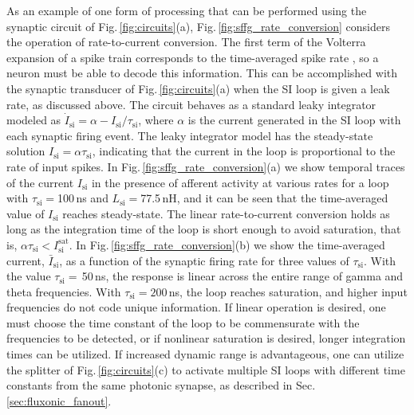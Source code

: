 \documentclass[twocolumn]{article}
\begin{document}
As an example of one form of processing that can be performed using the synaptic circuit of Fig.\,\ref{fig:circuits}(a), Fig.\,\ref{fig:sffg_rate_conversion} considers the operation of rate-to-current conversion. The first term of the Volterra expansion of a spike train corresponds to the time-averaged spike rate \cite{geki2002}, so a neuron must be able to decode this information. This can be accomplished with the synaptic transducer of Fig.\,\ref{fig:circuits}(a) when the SI loop is given a leak rate, as discussed above. The circuit behaves as a standard leaky integrator modeled as $\dot{I}_{\mathrm{si}} = \alpha-I_{\mathrm{si}}/\tau_{\mathrm{si}}$, where $\alpha$ is the current generated in the SI loop with each synaptic firing event. The leaky integrator model has the steady-state solution $I_{\mathrm{si}} = \alpha \tau_{\mathrm{si}}$, indicating that the current in the loop is proportional to the rate of input spikes. In Fig.\,\ref{fig:sffg_rate_conversion}(a) we show temporal traces of the current $I_{\mathrm{si}}$ in the presence of afferent activity at various rates for a loop with $\tau_{\mathrm{si}} = $100\,ns and $L_{\mathrm{si}} = $77.5\,nH, and it can be seen that the time-averaged value of $I_{\mathrm{si}}$ reaches steady-state. The linear rate-to-current conversion holds as long as the integration time of the loop is short enough to avoid saturation, that is, $\alpha \tau_{\mathrm{si}} < I_{\mathrm{si}}^{\mathrm{sat}}$. In Fig.\,\ref{fig:sffg_rate_conversion}(b) we show the time-averaged current, $\bar{I}_{\mathrm{si}}$, as a function of the synaptic firing rate for three values of $\tau_{\mathrm{si}}$. With the value $\tau_{\mathrm{si}} =$\,50\,ns, the response is linear across the entire range of gamma and theta frequencies. With $\tau_{\mathrm{si}} = 200$\,ns, the loop reaches saturation, and higher input frequencies do not code unique information. If linear operation is desired, one must choose the time constant of the loop to be commensurate with the frequencies to be detected, or if nonlinear saturation is desired, longer integration times can be utilized. If increased dynamic range is advantageous, one can utilize the splitter of Fig.\,\ref{fig:circuits}(c) to activate multiple SI loops with different time constants from the same photonic synapse, as described in Sec.\,\ref{sec:fluxonic_fanout}.
\end{document}
